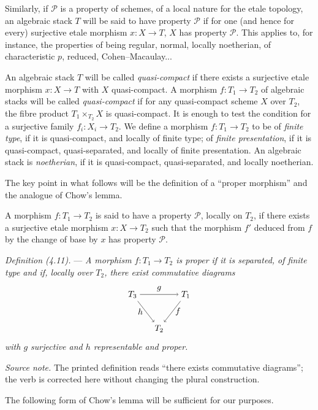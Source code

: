 \documentclass[10pt]{article}
\begin{document}
Similarly, if $\mathcal P$ is a property of schemes, of a local nature for the etale topology, an algebraic stack $T$ will be said to have property $\mathcal P$ if for one (and hence for every) surjective etale morphism $x:X\to T$, $X$ has property $\mathcal P$. This applies to, for instance, the properties of being regular, normal, locally noetherian, of characteristic $p$, reduced, Cohen--Macaulay...

An algebraic stack $T$ will be called \emph{quasi-compact} if there exists a surjective etale morphism $x:X\to T$ with $X$ quasi-compact. A morphism $f:T_1\to T_2$ of algebraic stacks will be called \emph{quasi-compact} if for any quasi-compact scheme $X$ over $T_2$, the fibre product $T_1\times_{T_2}X$ is quasi-compact. It is enough to test the condition for a surjective family $f_i:X_i\to T_2$. We define a morphism $f:T_1\to T_2$ to be of \emph{finite type}, if it is quasi-compact, and locally of finite type; of \emph{finite presentation}, if it is quasi-compact, quasi-separated, and locally of finite presentation. An algebraic stack is \emph{noetherian}, if it is quasi-compact, quasi-separated, and locally noetherian.

The key point in what follows will be the definition of a ``proper morphism'' and the analogue of Chow's lemma.

A morphism $f:T_1\to T_2$ is said to have a property $\mathcal P$, locally on $T_2$, if there exists a surjective etale morphism $x:X\to T_2$ such that the morphism $f'$ deduced from $f$ by the change of base by $x$ has property $\mathcal P$.

\medskip
\noindent\emph{Definition (4.11).} --- \emph{A morphism $f:T_1\to T_2$ is proper if it is separated, of finite type and if, locally over $T_2$, there exist commutative diagrams}
\[
\begin{tikzpicture}[baseline=(current bounding box.center)]
\node (T3) at (0,1.4) {$T_3$};
\node (T1) at (2.2,1.4) {$T_1$};
\node (T2) at (1.1,0) {$T_2$};
\draw[->] (T3) -- node[above] {$g$} (T1);
\draw[->] (T1) -- node[right] {$f$} (T2);
\draw[->] (T3) -- node[left] {$h$} (T2);
\end{tikzpicture}
\]
\emph{with $g$ surjective and $h$ representable and proper.}

\smallskip
\noindent\textit{Source note.} The printed definition reads ``there exists commutative diagrams''; the verb is corrected here without changing the plural construction.

The following form of Chow's lemma will be sufficient for our purposes.
\end{document}
